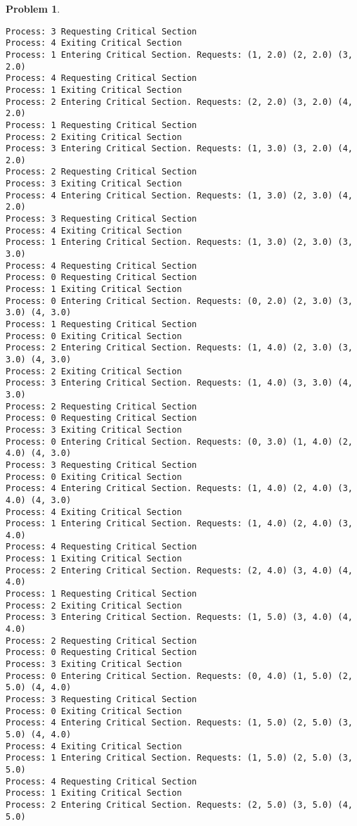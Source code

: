 \documentclass{article}
\theoremstyle{problemstyle}
\newtheorem{problem}{Problem}
\begin{document}
\begin{problem}
\begin{enumerate}[label=(\alph*)]
\begin{lstlisting}
Process: 3 Requesting Critical Section
Process: 4 Exiting Critical Section
Process: 1 Entering Critical Section. Requests: (1, 2.0) (2, 2.0) (3, 2.0)
Process: 4 Requesting Critical Section
Process: 1 Exiting Critical Section
Process: 2 Entering Critical Section. Requests: (2, 2.0) (3, 2.0) (4, 2.0)
Process: 1 Requesting Critical Section
Process: 2 Exiting Critical Section
Process: 3 Entering Critical Section. Requests: (1, 3.0) (3, 2.0) (4, 2.0)
Process: 2 Requesting Critical Section
Process: 3 Exiting Critical Section
Process: 4 Entering Critical Section. Requests: (1, 3.0) (2, 3.0) (4, 2.0)
Process: 3 Requesting Critical Section
Process: 4 Exiting Critical Section
Process: 1 Entering Critical Section. Requests: (1, 3.0) (2, 3.0) (3, 3.0)
Process: 4 Requesting Critical Section
Process: 0 Requesting Critical Section
Process: 1 Exiting Critical Section
Process: 0 Entering Critical Section. Requests: (0, 2.0) (2, 3.0) (3, 3.0) (4, 3.0)
Process: 1 Requesting Critical Section
Process: 0 Exiting Critical Section
Process: 2 Entering Critical Section. Requests: (1, 4.0) (2, 3.0) (3, 3.0) (4, 3.0)
Process: 2 Exiting Critical Section
Process: 3 Entering Critical Section. Requests: (1, 4.0) (3, 3.0) (4, 3.0)
Process: 2 Requesting Critical Section
Process: 0 Requesting Critical Section
Process: 3 Exiting Critical Section
Process: 0 Entering Critical Section. Requests: (0, 3.0) (1, 4.0) (2, 4.0) (4, 3.0)
Process: 3 Requesting Critical Section
Process: 0 Exiting Critical Section
Process: 4 Entering Critical Section. Requests: (1, 4.0) (2, 4.0) (3, 4.0) (4, 3.0)
Process: 4 Exiting Critical Section
Process: 1 Entering Critical Section. Requests: (1, 4.0) (2, 4.0) (3, 4.0)
Process: 4 Requesting Critical Section
Process: 1 Exiting Critical Section
Process: 2 Entering Critical Section. Requests: (2, 4.0) (3, 4.0) (4, 4.0)
Process: 1 Requesting Critical Section
Process: 2 Exiting Critical Section
Process: 3 Entering Critical Section. Requests: (1, 5.0) (3, 4.0) (4, 4.0)
Process: 2 Requesting Critical Section
Process: 0 Requesting Critical Section
Process: 3 Exiting Critical Section
Process: 0 Entering Critical Section. Requests: (0, 4.0) (1, 5.0) (2, 5.0) (4, 4.0)
Process: 3 Requesting Critical Section
Process: 0 Exiting Critical Section
Process: 4 Entering Critical Section. Requests: (1, 5.0) (2, 5.0) (3, 5.0) (4, 4.0)
Process: 4 Exiting Critical Section
Process: 1 Entering Critical Section. Requests: (1, 5.0) (2, 5.0) (3, 5.0)
Process: 4 Requesting Critical Section
Process: 1 Exiting Critical Section
Process: 2 Entering Critical Section. Requests: (2, 5.0) (3, 5.0) (4, 5.0)

\end{lstlisting}
\end{enumerate}
\end{problem}
\end{document}
